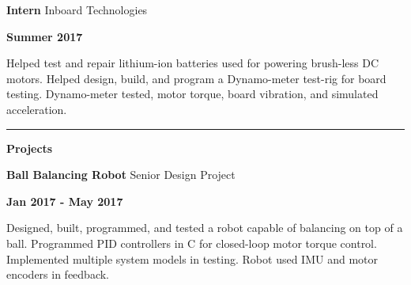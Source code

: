 \documentclass[paper=a4,fontsize=11pt]{article} %
\def \sectionSpace      {0.3cm}    %
\def \subSectionSpace   {0.25cm}     %
\def \leftColSpace      {0.1}       %
\def \middleColSpace    {0.73}       %
\def \bigMiddleColSpace {0.8}       %
\def \rightColSpace     {0.25}      %
\def \lineWidth         {20.25cm}   %
\def \lineThickness     {1pt}     %
\begin{document}
    \vspace{\subSectionSpace}  
    \noindent
    \begin{minipage}[t]{\leftColSpace\linewidth}
        \hfill
    \end{minipage}
    \begin{minipage}[t]{\middleColSpace\linewidth}
        \noindent \textbf{Intern} \quad Inboard Technologies
    \end{minipage}
    \begin{minipage}[t]{\rightColSpace\linewidth}
        \begin{flushleft}
            \noindent \textbf{Summer 2017}
        \end{flushleft}
    \end{minipage}

    \noindent
    \begin{minipage}[t]{\leftColSpace\linewidth}
        \hfill
    \end{minipage}
    \begin{minipage}[t]{\bigMiddleColSpace\linewidth}
        Helped test and repair lithium-ion batteries used for powering brush-less DC motors. Helped design, build, and program a Dynamo-meter test-rig for board testing. Dynamo-meter tested, motor torque, board vibration, and simulated acceleration.
    \end{minipage}
    
    \vspace{\sectionSpace}
    \noindent\rule{\lineWidth}{\lineThickness}

    \noindent
    \begin{minipage}[t]{\leftColSpace\linewidth}
        \noindent \textbf{Projects}
    \end{minipage}
    \begin{minipage}[t]{\middleColSpace\linewidth}
        \noindent \textbf{Ball Balancing Robot } \quad Senior Design Project
    \end{minipage}
    \begin{minipage}[t]{\rightColSpace\linewidth}
        \noindent \textbf{Jan 2017 - May 2017}
    \end{minipage}

    \noindent
    \begin{minipage}[t]{\leftColSpace\linewidth}
        \hfill
    \end{minipage}
    \begin{minipage}[t]{\bigMiddleColSpace\linewidth}
        Designed, built, programmed, and tested a robot capable of balancing on top of a ball. Programmed PID controllers in C for closed-loop motor torque control. Implemented multiple system models in testing. Robot used IMU and motor encoders in feedback.
    \end{minipage}
\end{document}
